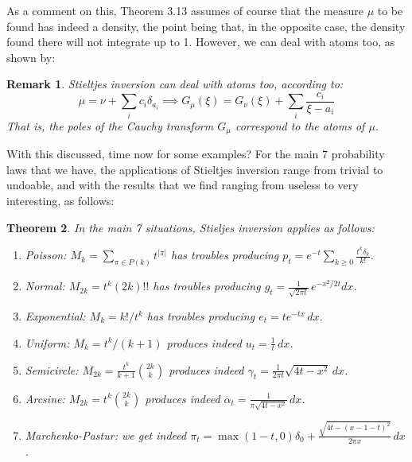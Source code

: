 \documentclass[12pt]{amsbook}
\newtheorem{theorem}{Theorem}[chapter]
\newtheorem{remark}[theorem]{Remark}
\begin{document}
As a comment on this, Theorem 3.13 assumes of course that the measure $\mu$ to be found has indeed a density, the point being that, in the opposite case, the density found there will not integrate up to 1. However, we can deal with atoms too, as shown by:


\begin{remark}
Stieltjes inversion can deal with atoms too, according to:
$$\mu=\nu+\sum_ic_i\delta_{a_i}\implies G_\mu(\xi)=G_{\nu}(\xi)+\sum_i\frac{c_i}{\xi-a_i}$$
That is, the poles of the Cauchy transform $G_\mu$ correspond to the atoms of $\mu$.
\end{remark}

With this discussed, time now for some examples? For the main 7 probability laws that we have, the applications of Stieltjes inversion range from trivial to undoable, and with the results that we find ranging from useless to very interesting, as follows:

\begin{theorem}
In the main 7 situations, Stieljes inversion applies as follows:
\begin{enumerate}
\item Poisson: $M_k=\sum_{\pi\in P(k)}t^{|\pi|}$ has troubles producing $p_t=e^{-t}\sum_{k\geq0}\frac{t^k\delta_k}{k!}$.

\item Normal: $M_{2k}=t^k(2k)!!$ has troubles producing $g_t=\frac{1}{\sqrt{2\pi t}}\,e^{-x^2/2t}dx$.

\item Exponential: $M_k=k!/t^k$ has troubles producing $e_t=te^{-tx}\,dx$. 

\item Uniform: $M_k=t^k/(k+1)$ produces indeed $u_t=\frac{1}{t}\,dx$.

\item Semicircle: $M_{2k}=\frac{t^k}{k+1}\binom{2k}{k}$ produces indeed $\gamma_t=\frac{1}{2\pi t}\sqrt{4t-x^2}\,dx$.

\item Arcsine: $M_{2k}=t^k\binom{2k}{k}$ produces indeed $\alpha_t=\frac{1}{\pi\sqrt{4t-x^2}}\,dx$.

\item Marchenko-Pastur: we get indeed $\pi_t=\max(1-t,0)\delta_0+\frac{\sqrt{4t-(x-1-t)^2}}{2\pi x}\,dx$.
\end{enumerate}
\end{theorem}
\end{document}
